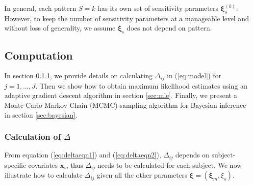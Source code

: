 \documentclass[12pt]{article}
\begin{document}
In general, each pattern $S = k$ has its own set of sensitivity
parameters $\bm \xi_s^{(k)}$. However, to keep the number of
sensitivity parameters at a manageable level \citep{dh2008} and
without loss of generality, we assume $\bm \xi_s$ does not depend on
pattern.

\subsection{Computation}
\label{sec:computation}

In section \ref{sec:deltacal}, we provide details on calculating
$\Delta_{ij}$ in (\ref{eq:model}) for $j = 1, \ldots, J$. Then we show
how to obtain maximum likelihood estimates using an adaptive gradient
descent algorithm in section \ref{sec:mle}. Finally, we present a
Monte Carlo Markov Chain (MCMC) sampling algorithm for Bayesian
inference in section \ref{sec:bayesian}.

\subsubsection{Calculation of $\Delta$ }
\label{sec:deltacal}
From equation (\ref{eq:deltaeqn1}) and (\ref{eq:deltaeqn2}),
$\Delta_{ij}$ depends on subject-specific covariates $\bm x_i$, thus
$\Delta_{ij}$ needs to be calculated for each subject. We now
illustrate how to calculate $\Delta_{ij}$ given all the other
parameters $\bm \xi = (\bm \xi_m, \xi_s)$.
\end{document}
